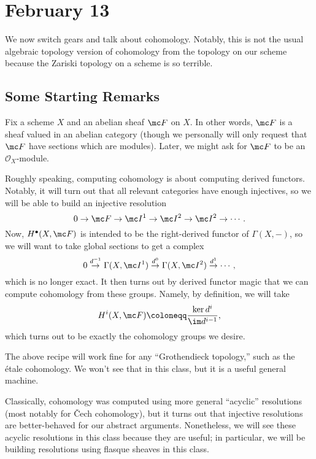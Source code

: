 \documentclass[../notes.tex]{subfiles}
\begin{document}
\section{February 13}

We now switch gears and talk about cohomology. Notably, this is not the usual algebraic topology version of cohomology from the topology on our scheme because the Zariski topology on a scheme is so terrible.

\subsection{Some Starting Remarks}
Fix a scheme $X$ and an abelian sheaf $\mc F$ on $X$. In other words, $\mc F$ is a sheaf valued in an abelian category (though we personally will only request that $\mc F$ have sections which are modules). Later, we might ask for $\mc F$ to be an $\mathcal O_X$-module.

Roughly speaking, computing cohomology is about computing derived functors. Notably, it will turn out that all relevant categories have enough injectives, so we will be able to build an injective resolution
\[0\to\mc F\to\mc I^1\to\mc I^2\to\mc I^2\to\cdots.\]
Now, $H^\bullet(X,\mc F)$ is intended to be the right-derived functor of $\Gamma(X,-)$, so we will want to take global sections to get a complex
\[0\stackrel{d^{-1}}\to\Gamma(X,\mc I^1)\stackrel{d^0}\to\Gamma(X,\mc I^2)\stackrel{d^1}\to\cdots,\]
which is no longer exact. It then turns out by derived functor magic that we can compute cohomology from these groups. Namely, by definition, we will take
\[H^i(X,\mc F)\coloneqq\frac{\ker d^i}{\im d^{i-1}},\]
which turns out to be exactly the cohomology groups we desire.
\begin{remark}
	The above recipe will work fine for any ``Grothendieck topology,'' such as the \'etale cohomology. We won't see that in this class, but it is a useful general machine.
\end{remark}
\begin{remark}
	Classically, cohomology was computed using more general ``acyclic'' resolutions (most notably for \v{C}ech cohomology), but it turns out that injective resolutions are better-behaved for our abstract arguments. Nonetheless, we will see these acyclic resolutions in this class because they are useful; in particular, we will be building resolutions using flasque sheaves in this class.
\end{remark}
\end{document}
